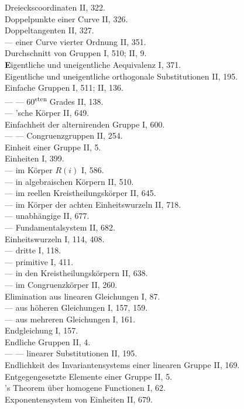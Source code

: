 Dreieckscoordinaten II, 322.\\
Doppelpunkte einer Curve II, 326.\\
Doppeltangenten II, 327.\\
--- einer Curve vierter Ordnung II, 351.\\
Durchschnitt von Gruppen I, 510; II, 9.\\

\medskip
\noindent
\textbf{E}igentliche und uneigentliche Aequivalenz I, 371.\\
Eigentliche und uneigentliche orthogonale Substitutionen II, 195.\\
Einfache Gruppen I, 511; II, 136.\\
--- --- 60\textsuperscript{sten} Grades II, 138.\\
--- 'sche K\"orper II, 649.\\
Einfachheit der alternirenden Gruppe I, 600.\\
--- --- Congruenzgruppen II, 254.\\
Einheit einer Gruppe II, 5.\\
Einheiten I, 399.\\
--- im K\"orper $R(i)$ I, 586.\\
--- in algebraischen K\"orpern II, 510.\\
--- im reellen Kreistheilungsk\"orper II, 645.\\
--- im K\"orper der achten Einheitswurzeln II, 718.\\
--- unabh\"angige II, 677.\\
--- Fundamentalsystem II, 682.\\
Einheitswurzeln I, 114, 408.\\
--- dritte I, 118.\\
--- primitive I, 411.\\
--- in den Kreistheilungsk\"orpern II, 638.\\
--- im Congruenzk\"orper II, 260.\\
Elimination aus linearen Gleichungen I, 87.\\
--- aus h\"oheren Gleichungen I, 157, 159.\\
--- aus mehreren Gleichungen I, 161.\\
Endgleichung I, 157.\\
Endliche Gruppen II, 4.\\
--- --- linearer Substitutionen II, 195.\\
Endlichkeit des Invariantensystems einer linearen Gruppe II, 169.\\
Entgegengesetzte Elemente einer Gruppe II, 5.\\
's Theorem \"uber homogene Functionen I, 62.\\
Exponentensystem von Einheiten II, 679.\\

